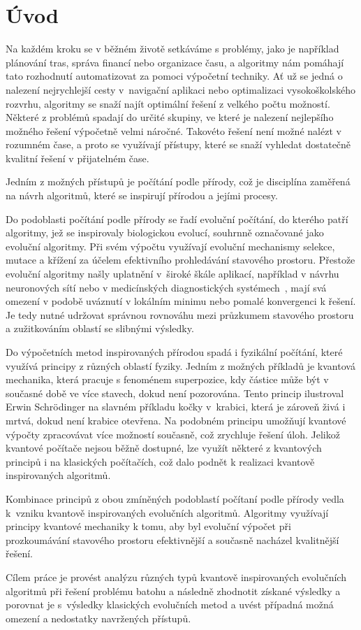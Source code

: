\chapter{Úvod}
Na každém kroku se v běžném životě setkáváme s problémy, jako je například plánování tras, správa financí nebo organizace času, a algoritmy nám pomáhají tato rozhodnutí automatizovat za pomoci výpočetní techniky. 
Ať už se jedná o nalezení nejrychlejší cesty v~navigační aplikaci nebo optimalizaci vysokoškolského rozvrhu, algoritmy se snaží najít optimální řešení z velkého počtu možností. 
Některé z problémů spadají do určité skupiny, ve které je nalezení nejlepšího možného řešení výpočetně velmi náročné. 
Takovéto řešení není možné nalézt v rozumném čase, a proto se využívají přístupy, které se snaží vyhledat dostatečně kvalitní řešení v přijatelném čase. 

Jedním z možných přístupů je počítání podle přírody, což je disciplína zaměřená na návrh algoritmů, které se inspirují přírodou a jejími procesy. 

Do podoblasti počítání podle přírody se řadí evoluční počítání, do kterého patří algoritmy, jež se inspirovaly biologickou evolucí, souhrnně označované jako evoluční algoritmy. 
Při svém výpočtu využívají evoluční mechanismy selekce, mutace a křížení za účelem efektivního prohledávání stavového prostoru. 
Přestože evoluční algoritmy našly uplatnění v~široké škále aplikací, například v návrhu neuronových sítí nebo v medicínských diagnostických systémech~\cite{ea-applications}, mají svá omezení v podobě uváznutí v lokálním minimu nebo pomalé konvergenci k řešení. 
Je tedy nutné udržovat správnou rovnováhu mezi průzkumem stavového prostoru a zužitkováním oblastí se slibnými výsledky.

Do výpočetních metod inspirovaných přírodou spadá i fyzikální počítání, které využívá principy z různých oblastí fyziky. 
Jedním z možných příkladů je kvantová mechanika, která pracuje s fenoménem superpozice, kdy částice může být v současné době ve více stavech, dokud není pozorována. 
Tento princip ilustroval Erwin Schrödinger na slavném příkladu kočky v~krabici, která je zároveň živá i mrtvá, dokud není krabice otevřena. 
Na podobném principu umožňují kvantové výpočty zpracovávat více možností současně, což zrychluje řešení úloh.
Jelikož kvantové počítače nejsou běžně dostupné, lze využít některé z kvantových principů i na klasických počítačích, což dalo podnět k realizaci kvantově inspirovaných algoritmů. 

Kombinace principů z obou zmíněných podoblastí počítaní podle přírody vedla k~vzniku kvantově inspirovaných evolučních algoritmů. 
Algoritmy využívají principy kvantové mechaniky k tomu, aby byl evoluční výpočet při prozkoumávání stavového prostoru efektivnější a současně nacházel kvalitnější řešení. 

Cílem práce je provést analýzu různých typů kvantově inspirovaných evolučních algoritmů při řešení problému batohu a následně zhodnotit získané výsledky a porovnat je s~výsledky klasických evolučních metod a uvést případná možná omezení a nedostatky navržených přístupů.
